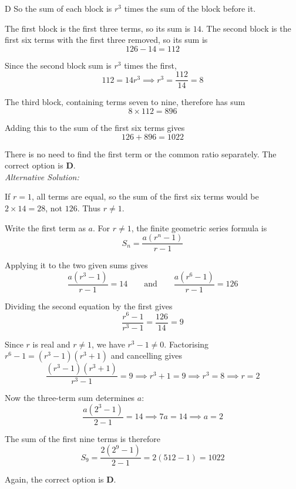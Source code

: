 \documentclass[11pt,a4paper]{article}
\begin{document}
\begin{enumerate}[label=\textbf{\arabic*.},leftmargin=*,itemsep=0pt,start=6]
\begin{djsSolution}{D}
So the sum of each block is $r^3$ times the sum of the block before it.

The first block is the first three terms, so its sum is $14$. The second block is the first six terms with the first three removed, so its sum is
\[
126-14=112
\]

Since the second block sum is $r^3$ times the first,
\[
112=14r^3 \implies r^3=\frac{112}{14}=8
\]

The third block, containing terms seven to nine, therefore has sum
\[
8\times112=896
\]

Adding this to the sum of the first six terms gives
\[
126+896=\boxed{1022}
\]

There is no need to find the first term or the common ratio separately. The correct option is \textbf{D}.\\[5pt]

\textit{Alternative Solution:}

If $r=1$, all terms are equal, so the sum of the first six terms would be $2\times14=28$, not $126$. Thus $r\ne1$.

Write the first term as $a$. For $r\ne1$, the finite geometric series formula is
\[
S_n=\frac{a(r^n-1)}{r-1}
\]

Applying it to the two given sums gives
\[
\frac{a(r^3-1)}{r-1}=14
\qquad\text{and}\qquad
\frac{a(r^6-1)}{r-1}=126
\]

Dividing the second equation by the first gives
\[
\frac{r^6-1}{r^3-1}=\frac{126}{14}=9
\]

Since $r$ is real and $r\ne1$, we have $r^3-1\ne0$. Factorising $r^6-1=(r^3-1)(r^3+1)$ and cancelling gives
\[
\frac{(r^3-1)(r^3+1)}{r^3-1}=9
\implies r^3+1=9
\implies r^3=8
\implies r=2
\]

Now the three-term sum determines $a$:
\[
\frac{a(2^3-1)}{2-1}=14
\implies 7a=14
\implies a=2
\]

The sum of the first nine terms is therefore
\[
S_9=\frac{2(2^9-1)}{2-1}=2(512-1)=1022
\]

Again, the correct option is \textbf{D}.
\end{djsSolution}
\end{enumerate}
\clearpage
\thispagestyle{djssolutions}
\vspace*{8pt}
\end{document}

